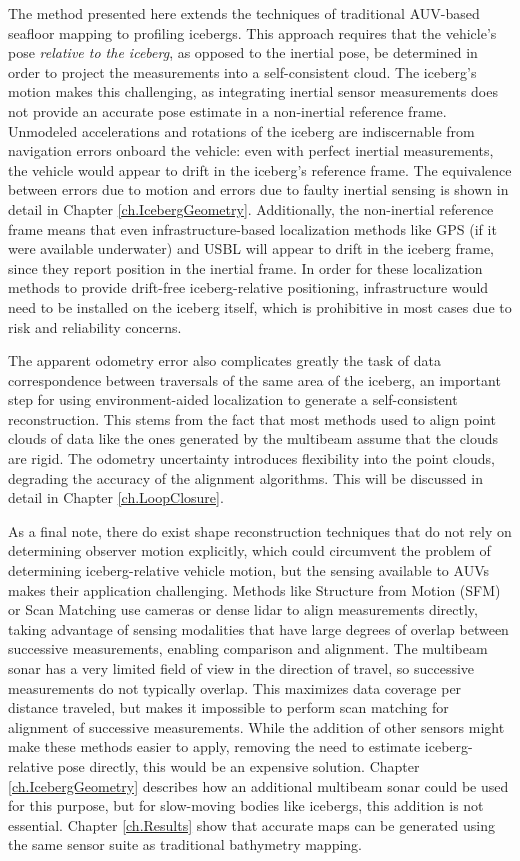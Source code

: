 The method presented here extends the techniques of traditional AUV-based seafloor mapping to profiling icebergs. This approach requires that the vehicle's pose \emph{relative to the iceberg}, as opposed to the inertial pose, be determined in order to project the measurements into a self-consistent cloud. The iceberg's motion makes this challenging, as integrating inertial sensor measurements does not provide an accurate pose estimate in a non-inertial reference frame. Unmodeled accelerations and rotations of the iceberg are indiscernable from navigation errors onboard the vehicle: even with perfect inertial measurements, the vehicle would appear to drift in the iceberg's reference frame. The equivalence between errors due to motion and errors due to faulty inertial sensing is shown in detail in Chapter \ref{ch.IcebergGeometry}. Additionally, the non-inertial reference frame means that even infrastructure-based localization methods like GPS (if it were available underwater) and USBL will appear to drift in the iceberg frame, since they report position in the inertial frame. In order for these localization methods to provide drift-free iceberg-relative positioning, infrastructure would need to be installed on the iceberg itself, which is prohibitive in most cases due to risk and reliability concerns. 

The apparent odometry error also complicates greatly the task of data correspondence between traversals of the same area of the iceberg, an important step for using environment-aided localization to generate a self-consistent reconstruction. This stems from the fact that most methods used to align point clouds of data like the ones generated by the multibeam assume that the clouds are rigid. The odometry uncertainty introduces flexibility into the point clouds, degrading the accuracy of the alignment algorithms. This will be discussed in detail in Chapter \ref{ch.LoopClosure}.

As a final note, there do exist shape reconstruction techniques that do not rely on determining observer motion explicitly, which could circumvent the problem of determining iceberg-relative vehicle motion, but the sensing available to AUVs makes their application challenging. Methods like Structure from Motion (SFM) \cite{Sturm1996} or Scan Matching  \cite{Gutmann1996} use cameras or dense lidar to align measurements directly, taking advantage of sensing modalities that have large degrees of overlap between successive measurements, enabling comparison and alignment. The multibeam sonar has a very limited field of view in the direction of travel, so successive measurements do not typically overlap. This maximizes data coverage per distance traveled, but makes it impossible to perform scan matching for alignment of successive measurements. While the addition of other sensors might make these methods easier to apply, removing the need to estimate iceberg-relative pose directly, this would be an expensive solution. Chapter \ref{ch.IcebergGeometry} describes how an additional multibeam sonar could be used for this purpose, but for slow-moving bodies like icebergs, this addition is not essential. Chapter \ref{ch.Results} show that accurate maps can be generated using the same sensor suite as traditional bathymetry mapping.

